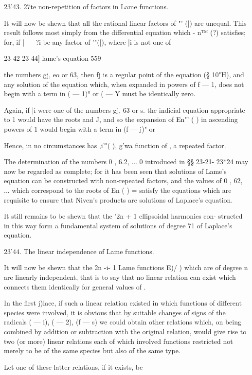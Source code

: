 {{{{{{{23'43. 27te non-repetition of factors in Lame functions.

It will now be shewn that all the rational linear factors of "' (|)
are unequal. This result follows most simply from the differential
equation which - n™ (?) satisfies; for, if | — ?i be any factor of
'"(|), where |i is not one of

23-42-23-44] lame's equation 559

the numbers gj, eo or 63, then fj is a regular point of the equation
(§ 10"H), and any solution of the equation which, when expanded in
powers of f — 1, does not begin with a term in ( — 1)° or ( — Y must
be identically zero.

Again, if |i were one of the numbers gj, 63 or s. the indicial
equation appropriate to 1 would have the roots and J, and so the
expansion of En"' ( ) in ascending powers of 1 would begin with a term
in (f — j)" or

Hence, in no circumstances has ,i'"( ), g'wa function of , a repeated
factor.

The determination of the numbers 0 , 6.2, ... 0 introduced in §§
23-21- 23*24 may now be regarded as complete; for it has been seen
that solutions of Lame's equation can be constructed with non-repeated
factors, and the values of 0 , 62, ... which correspond to the roots
of En ( ) = satisfy the equations which are requisite to ensure that
Niven's products are solutions of Laplace's equation.

It still remains to be shewn that the '2n + 1 ellipsoidal harmonics
con- structed in this way form a fundamental system of solutions of
degree 71 of Laplace's equation.

23'44. The linear independence of Lame functions.

It will now be shewn that the 2n -i- 1 Lame functions E)/ ) which are
of degree n are linearly independent, that is to say that no linear
relation can exist which connects them identically for general values
of .

In the first j)lace, if such a linear relation existed in which
functions of different species were involved, it is obvious that by
suitable changes of signs of the radicals \/( — i), \/( — 2), \/(f —
s) we could obtain other relations which, on being combined by
addition or subtraction with the original relation, would give rise to
two (or more) linear relations each of which involved functions
restricted not merely to be of the same species but also of the same
type.

Let one of these latter relations, if it exists, be

}}}}}}}
